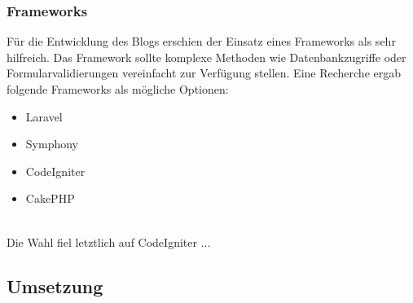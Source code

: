     \subsubsection{Frameworks}
    Für die Entwicklung des Blogs erschien der Einsatz eines Frameworks als sehr hilfreich. Das Framework sollte komplexe Methoden wie
    Datenbankzugriffe oder Formularvalidierungen vereinfacht zur Verfügung stellen. Eine Recherche ergab folgende Frameworks als mögliche
    Optionen:

    \begin{itemize}
      \item Laravel
      \item Symphony
      \item CodeIgniter
      \item CakePHP
    \end{itemize}
    \\
    Die Wahl fiel letztlich auf CodeIgniter ...

  \subsection{Umsetzung}

